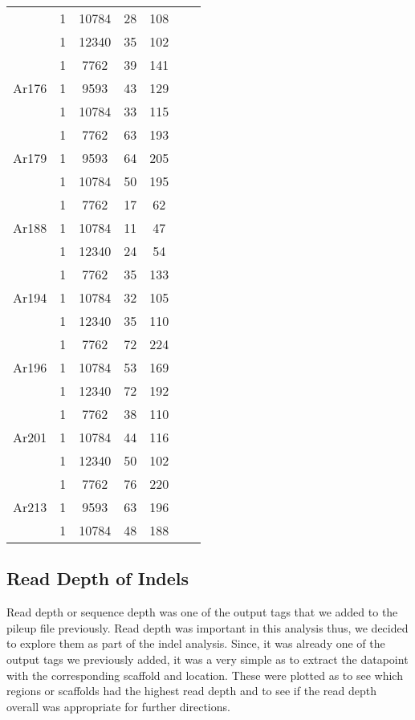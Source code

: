 \documentclass[12pt]{article}
\begin{document}
\begin{table}[H]
\begin{center}
\begin{singlespace}
{\begin{tabular}{ |c|c|c|c|c|c|c| }
					& 1 & 10784 & 28 & 108  \\ 
					& 1 & 12340 & 35 & 102 \\ 
					\hline
					\multirow{3}{4em}{Ar176} & 1 & 7762 & 39 & 141 \\ 
					& 1 & 9593 & 43 & 129  \\ 
					& 1 & 10784 & 33 & 115 \\ 
					\hline
					\multirow{3}{4em}{Ar179} & 1 & 7762 & 63 & 193 \\ 
					& 1 & 9593 & 64 & 205  \\ 
					& 1 & 10784 & 50 & 195 \\ 
					\hline
					\multirow{3}{4em}{Ar188} & 1 & 7762 & 17 & 62 \\ 
					& 1 & 10784 & 11 & 47  \\ 
					& 1 & 12340 & 24 & 54 \\ 
					\hline
					\multirow{3}{4em}{Ar194} & 1 & 7762 & 35 & 133 \\ 
					& 1 & 10784 & 32 & 105  \\ 
					& 1 & 12340 & 35 & 110 \\ 
					\hline
					\multirow{3}{4em}{Ar196} & 1 & 7762 & 72 & 224 \\ 
					& 1 & 10784 & 53 & 169  \\ 
					& 1 & 12340 & 72 & 192 \\ 
					\hline
					\multirow{3}{4em}{Ar201} & 1 & 7762 & 38 & 110 \\ 
					& 1 & 10784 & 44 & 116  \\ 
					& 1 & 12340 & 50 & 102 \\ 
					\hline
					\multirow{3}{4em}{Ar213} & 1 & 7762 & 76 & 220 \\ 
					& 1 & 9593 & 63 & 196  \\ 
					& 1 & 10784 & 48 & 188 \\ 
					\hline
				\end{tabular}
			}
		\end{singlespace}
	\end{center}
\end{table}

\subsection{Read Depth of Indels}

Read depth or sequence depth was one of the output tags that we added to the pileup file previously. Read depth was important in this analysis thus, we decided to explore them as part of the indel analysis. Since, it was already one of the output tags we previously added, it was a very simple as to extract the datapoint with the corresponding scaffold and location. These were plotted as to see which regions or scaffolds had the highest read depth and to see if the read depth overall was appropriate for further directions.
\end{document}
